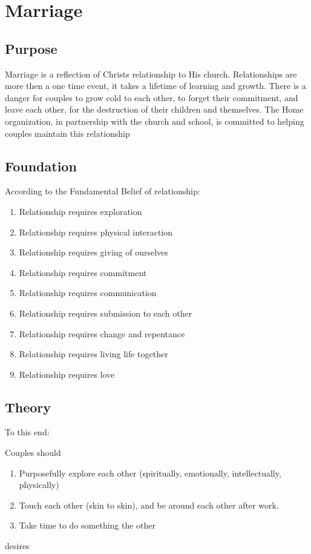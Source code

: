 \documentclass[CSHFoundation.tex]{subfiles}
\begin{document}
\section{Marriage}
\subsection{Purpose}
Marriage is a reflection of Christs relationship to His church. Relationships are more then a one time event, it takes a lifetime of learning and growth. There is a danger for couples to grow cold to each other, to forget their commitment, and leave each other, for the destruction of their children and themselves. The Home organization, in partnership with the church and school, is committed to helping couples maintain this relationship

\subsection{Foundation}
According to the Fundamental Belief of relationship:

\begin{enumerate}
\item Relationship requires exploration
\item Relationship requires physical interaction
\item Relationship requires giving of ourselves
\item Relationship requires commitment
\item Relationship requires communication
\item Relationship requires submission to each other
\item Relationship requires change and repentance
\item Relationship requires living life together
\item Relationship requires love
\end{enumerate}

\subsection{Theory}
To this end:

Couples should

\begin{enumerate}
\item Purposefully explore each other (spiritually, emotionally, intellectually, physically)
\item Touch each other (skin to skin), and be around each other after work.
\item Take time to do something the other 
\end{enumerate}desires
\end{document}
